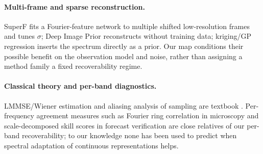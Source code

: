 \paragraph{Multi-frame and sparse reconstruction.}
SuperF \citep{superf2026} fits a Fourier-feature network to multiple shifted
low-resolution frames and tunes $\sigma$; Deep Image Prior
\citep{ulyanov2018dip} reconstructs without training data; kriging/GP
regression \citep{rasmussen2006gp} inserts the spectrum directly as a prior.
Our map conditions their possible benefit on the observation model and noise,
rather than assigning a method family a fixed recoverability regime.

\paragraph{Classical theory and per-band diagnostics.}
LMMSE/Wiener estimation and aliasing analysis of sampling are textbook
\citep{kay1993estimation}. Per-frequency agreement measures such as
Fourier ring correlation in microscopy \citep{vanheel2005frc} and
scale-decomposed skill scores in forecast verification are close relatives of
our per-band recoverability; to our knowledge none has been used to predict
when spectral adaptation of continuous representations helps.
